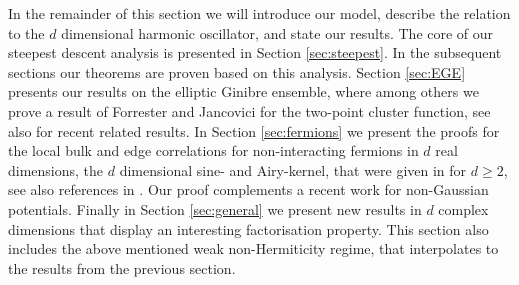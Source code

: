 \documentclass[%
 jmp,
cp,  %
 amsmath,amsthm,amssymb,%
 reprint,%
onecolumn]{revtex4-2}
\begin{document}
In the remainder of this section we will introduce our model, describe the relation to the $d$ dimensional harmonic oscillator, and state our results. The core of our steepest descent analysis is presented in Section \ref{sec:steepest}. In the subsequent sections our theorems are proven based on this analysis. Section \ref{sec:EGE} presents our results on the elliptic Ginibre ensemble, where among others we prove a result of Forrester and Jancovici \cite{FoJa} for the two-point cluster function, see also \cite{AmCr} for recent related results. In Section \ref{sec:fermions} we present the proofs for the local bulk and edge correlations for non-interacting fermions in $d$ real dimensions, the $d$ dimensional sine- and Airy-kernel, that were given in \cite{DeDoMaSc} for $d\geq2$, see also references in \cite{DeDoMaSc3}. Our proof complements a recent work \cite{DeLa} for non-Gaussian potentials. Finally in Section \ref{sec:general} we present new results in $d$ complex dimensions that display an interesting factorisation property. This section also includes the above mentioned weak non-Hermiticity regime, that interpolates to the results from the previous section. 
\end{document}
